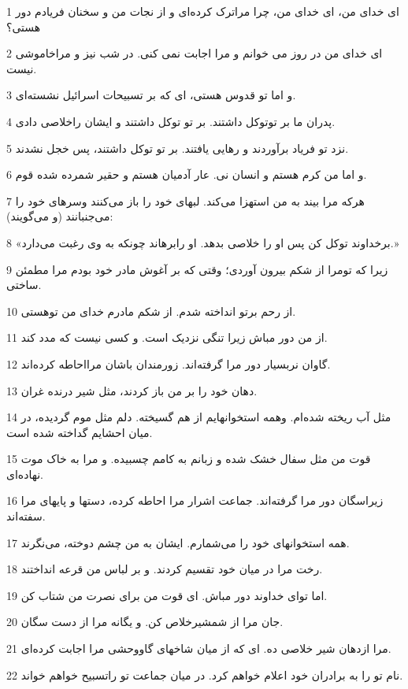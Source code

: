 \par 1 ای خدای من، ای خدای من، چرا مراترک کرده‌ای و از نجات من و سخنان فریادم دور هستی؟
\par 2 ‌ای خدای من در روز می خوانم و مرا اجابت نمی کنی. در شب نیز و مراخاموشی نیست.
\par 3 و اما تو قدوس هستی، ای که بر تسبیحات اسرائیل نشسته‌ای.
\par 4 پدران ما بر توتوکل داشتند. بر تو توکل داشتند و ایشان راخلاصی دادی.
\par 5 نزد تو فریاد برآوردند و رهایی یافتند. بر تو توکل داشتند، پس خجل نشدند.
\par 6 و اما من کرم هستم و انسان نی. عار آدمیان هستم و حقیر شمرده شده قوم.
\par 7 هرکه مرا بیند به من استهزا می‌کند. لبهای خود را باز می‌کنند وسرهای خود را می‌جنبانند (و می‌گویند):
\par 8 «برخداوند توکل کن پس او را خلاصی بدهد. او رابرهاند چونکه به وی رغبت می‌دارد.»
\par 9 زیرا که تومرا از شکم بیرون آوردی؛ وقتی که بر آغوش مادر خود بودم مرا مطمئن ساختی.
\par 10 از رحم برتو انداخته شدم. از شکم مادرم خدای من توهستی.
\par 11 از من دور مباش زیرا تنگی نزدیک است. و کسی نیست که مدد کند.
\par 12 گاوان نربسیار دور مرا گرفته‌اند. زورمندان باشان مرااحاطه کرده‌اند.
\par 13 دهان خود را بر من باز کردند، مثل شیر درنده غران.
\par 14 مثل آب ریخته شده‌ام. وهمه استخوانهایم از هم گسیخته. دلم مثل موم گردیده، در میان احشایم گداخته شده است.
\par 15 قوت من مثل سفال خشک شده و زبانم به کامم چسبیده. و مرا به خاک موت نهاده‌ای.
\par 16 زیراسگان دور مرا گرفته‌اند. جماعت اشرار مرا احاطه کرده، دستها و پایهای مرا سفته‌اند.
\par 17 همه استخوانهای خود را می‌شمارم. ایشان به من چشم دوخته، می‌نگرند.
\par 18 رخت مرا در میان خود تقسیم کردند. و بر لباس من قرعه انداختند.
\par 19 اما تو‌ای خداوند دور مباش. ای قوت من برای نصرت من شتاب کن.
\par 20 جان مرا از شمشیرخلاص کن. و یگانه مرا از دست سگان.
\par 21 مرا ازدهان شیر خلاصی ده. ای که از میان شاخهای گاووحشی مرا اجابت کرده‌ای.
\par 22 نام تو را به برادران خود اعلام خواهم کرد. در میان جماعت تو راتسبیح خواهم خواند.
